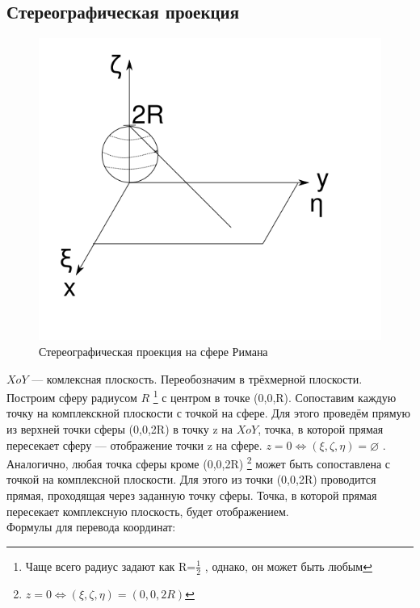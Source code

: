 \documentclass{article}
\begin{document}
        \subsection{Стереографическая проекция}
            \begin{figure}[h]
                \includegraphics[width=0.8\linewidth]{stereo_example}
                \caption{Стереографическая проекция на сфере Римана}
                \label{ris:stereo_example}
            \end{figure}
            $X o Y$ --- комлексная плоскость. Переобозначим в трёхмерной плоскости. Построим сферу радиусом $R$ \footnote{Чаще всего радиус задают как R=$\frac{1}{2}$ , однако, он может быть любым} с центром в точке (0,0,R). Сопоставим каждую точку на комплекскной плоскости с точкой на сфере. Для этого проведём прямую из верхней точки сферы (0,0,2R) в точку z на $X o Y$, точка, в которой прямая пересекает сферу --- отображение точки z на сфере. $z=0 \Leftrightarrow (\xi,\zeta,\eta)=\varnothing$ . Аналогично, любая точка сферы кроме (0,0,2R) \footnote{$z=0 \Leftrightarrow (\xi,\zeta,\eta)=(0,0,2R)$} может быть сопоставлена с точкой на комплексной плоскости. Для этого из точки (0,0,2R) проводится прямая, проходящая через заданную точку сферы. Точка, в которой прямая пересекает комплексную плоскость, будет отображением.\\
          Формулы для перевода координат:
\end{document}
